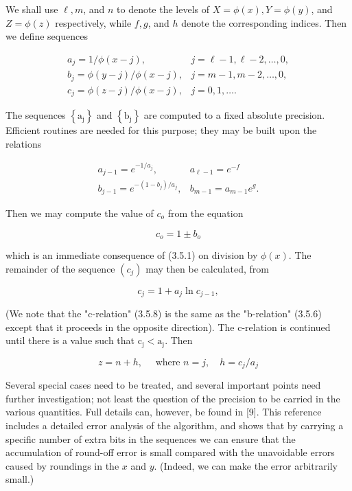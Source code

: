 \documentclass[10pt]{article}
\begin{document}
We shall use $\ell, m$, and $n$ to denote the levels of $X=\phi(x), Y=\phi(y)$, and $Z=\phi(z)$ respectively, while $f, g$, and $h$ denote the corresponding indices. Then we define sequences

$$
\begin{array}{ll}
a_{j}=1 / \phi(x-j), & j=\ell-1, \ell-2, \ldots, 0, \\
b_{j}=\phi(y-j) / \phi(x-j), & j=m-1, m-2, \ldots, 0, \\
c_{j}=\phi(z-j) / \phi(x-j), & j=0,1, \ldots .
\end{array}
$$

The sequences $\left\{\mathrm{a}_{\mathrm{j}}\right\}$ and $\left\{\mathrm{b}_{\mathrm{j}}\right\}$ are computed to a fixed absolute precision. Efficient routines are needed for this purpose; they may be built upon the relations

\[
\begin{array}{ll}
a_{j-1}=e^{-1 / a_{j}}, & a_{\ell-1}=e^{-f} \\
b_{j-1}=e^{-\left(1-b_{j}\right) / a_{j}}, & b_{m-1}=a_{m-1} e^{g} . \tag{3.5.6}
\end{array}
\]

Then we may compute the value of $c_{o}$ from the equation


\begin{equation*}
c_{o}=1 \pm b_{o} \tag{3.5.7}
\end{equation*}


which is an immediate consequence of (3.5.1) on division by $\phi(x)$. The remainder of the sequence $\left(c_{j}\right)$ may then be calculated, from


\begin{equation*}
c_{j}=1+a_{j} \ln c_{j-1}, \tag{3.5.8}
\end{equation*}


(We note that the "c-relation" (3.5.8) is the same as the "b-relation" (3.5.6) except that it proceeds in the opposite direction). The c-relation is continued until there is a value such that $\mathrm{c}_{\mathrm{j}}<\mathrm{a}_{\mathrm{j}}$. Then

$$
z=n+h, \quad \text { where } n=j, \quad h=c_{j} / a_{j}
$$

Several special cases need to be treated, and several important points need further investigation; not least the question of the precision to be carried in the various quantities. Full details can, however, be found in [9]. This reference includes a detailed error analysis of the algorithm, and shows that by carrying a specific number of extra bits in the sequences we can ensure that the accumulation of round-off error is small compared with the unavoidable errors caused by roundings in the $x$ and $y$. (Indeed, we can make the error arbitrarily small.)
\end{document}
